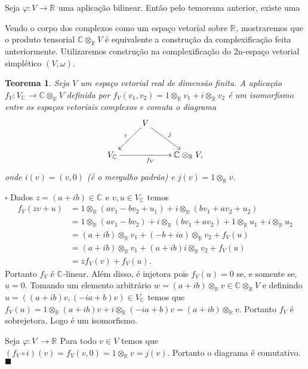 \documentclass[12pt]{book}
\newtheorem{teorema}{Teorema}[section]
\newenvironment{prova}[1]{$\square$ #1}{\hfill$\blacksquare$}
\newcommand{\complexificacao}[1]{#1_{\complexo{}}}
\newcommand{\complexificacaotensorial}[1]{\complexo{}\otimes_{\reta} #1}
\newcommand{\complexo}[1]{\mathbb{C}^{#1}}
\newcommand{\real}[1]{\mathbb{R}^{#1}}
\newcommand{\reta}{\real{}}
\begin{document}
	Seja $\varphi: V \to \reta$ uma aplicação bilinear. Então pelo temorema anterior, existe uma 
	
	Vendo o corpo dos complexos como um espaço vetorial sobre $\reta$, mostraremos que o produto tensorial $\complexificacaotensorial{V}$ é equivalente a construção da complexificação feita anteriormente. Utilizaremos construção na complexificação do 2n-espaço vetorial simplético $(V, \omega)$.
	
	\begin{teorema}\label{teorema_isomorfismo_complexificacao}
		Seja $V$ um espaço vetorial real de dimensão finita. A aplicação $f_{V}: \complexificacao{V} \to \complexificacaotensorial{V}$ definida por  $f_{V}(v_{1},v_{2}) = 1\otimes_{\reta} v_{1} + i \otimes_{\reta} v_{2}$ é um isomorfismo entre os espaços vetoriais complexos e comuta o diagrama
		$$
		\xymatrix{
			& V\ar[dl]_{i}\ar[rd]^{j} &
			\\
			\complexificacao{V}\ar[rr]_{f_{V}}& & \complexificacaotensorial{V},
		}
		$$
		onde $i(v) = (v,0)$ (é o mergulho padrão) e $j(v) = 1\otimes_{\reta} v$.
	\end{teorema}
	\begin{prova}
		Dados $z=(a+ib) \in \complexo{}$ e $v,u \in \complexificacao{V}$ temos
		$$
		\begin{aligned}
		f_{V}(zv+u) &= 1\otimes_{\reta} (a v_{1} - bv_{2} + u_{1}) + i \otimes_{\reta} (bv_{1}+av_{2} + u_{2})
		\\
		&=1\otimes_{\reta} (a v_{1} - bv_{2}) + i \otimes_{\reta} (bv_{1}+av_{2})+1\otimes_{\reta} u_{1} + i \otimes_{\reta} u_{2}
		\\
		&=(a+ib)\otimes_{\reta}v_{1} + (-b+ia)\otimes_{\reta} v_{2}+f_{V}(u)
		\\
		&=(a+ib)\otimes_{\reta}v_{1} + (a+ib)i\otimes_{\reta} v_{2}+f_{V}(u)
		\\
		&=zf_{V}(v)+f_{V}(u).
		\end{aligned}
		$$
		Portanto $f_{V}$ é $\complexo{}$-linear. Além disso, é injetora pois $f_{V}(u) = 0$ se, e somente se, $u = 0$. Tomando um elemento arbitrário $w = (a+ib)\otimes_{\reta}v \in \complexificacaotensorial{V} $ e definindo $u = ((a+ib)v, (-ia+b)v) \in \complexificacao{V}$ temos que $f_{V}(u) = 1\otimes_{\reta} (a+ib)v + i \otimes_{\reta} (-ia+b)v = (a+ib)\otimes_{\reta} v$. Portanto $f_{V}$ é sobrejetora. Logo é um isomorfismo.
		
		Seja $\varphi : V\ \to \reta$ Para todo $v \in V$ temos que $(f_{V}\circ i )(v) = f_{V}(v, 0) = 1\otimes_{\reta} v = j(v)$. Portanto o diagrama é comutativo.
	\end{prova}
	
\end{document}
